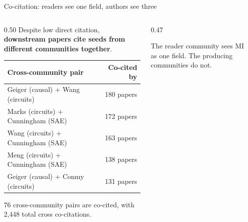 \documentclass[aspectratio=169,11pt]{beamer}
\begin{document}
\begin{frame}[label=cocitation]{Co-citation: readers see one field, authors see three}
\begin{columns}[T]
\begin{column}{0.50\textwidth}
{\small Despite low direct citation, \textbf{downstream papers cite seeds from different communities together}.}

\vspace{0.5em}
{\scriptsize
\begin{tabular}{p{4cm}r}
\toprule
\textbf{Cross-community pair} & \textbf{Co-cited by} \\
\midrule
Geiger (causal) + Wang (circuits) & 180 papers \\
Marks (circuits) + Cunningham (SAE) & 172 papers \\
Wang (circuits) + Cunningham (SAE) & 163 papers \\
Meng (circuits) + Cunningham (SAE) & 138 papers \\
Geiger (causal) + Conmy (circuits) & 131 papers \\
\bottomrule
\end{tabular}
}

\vspace{0.5em}
{\small 76 cross-community pairs are co-cited, with 2,448 total cross co-citations.}
\end{column}
\begin{column}{0.47\textwidth}
\centering
\vspace{0.3em}

\vspace{0.3em}
{\scriptsize The reader community sees MI as one field. The producing communities do not.}
\end{column}
\end{columns}
\end{frame}
\end{document}
